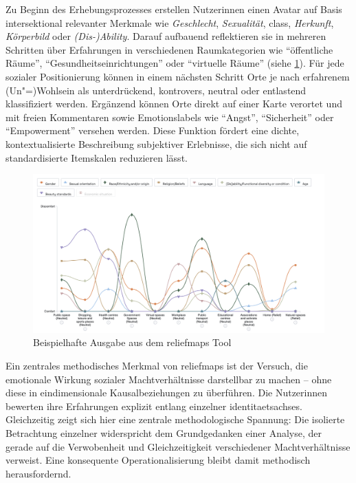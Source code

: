 Zu Beginn des Erhebungsprozesses erstellen Nutzer\genderstern innen einen Avatar auf Basis intersektional relevanter Merkmale wie \emph{Geschlecht}, \emph{Sexualität}, \gls{class}, \emph{Herkunft}, \emph{Körperbild} oder \emph{(Dis-)Ability}. Darauf aufbauend reflektieren sie in mehreren Schritten über Erfahrungen in verschiedenen Raumkategorien wie \enquote{öffentliche Räume}, \enquote{Gesundheitseinrichtungen} oder \enquote{virtuelle Räume} (siehe \cref{fig:relief_maps_plus_screenshot_1}). Für jede  sozialer Positionierung können in einem nächsten Schritt Orte je nach erfahrenem (Un\nobreakdash"=)Wohlsein als unterdrückend, kontrovers, neutral oder entlastend klassifiziert werden. Ergänzend können Orte direkt auf einer Karte verortet und mit freien Kommentaren sowie Emotionslabels wie \enquote{Angst}, \enquote{Sicherheit} oder \enquote{Empowerment} versehen werden. Diese Funktion fördert eine dichte, kontextualisierte Beschreibung subjektiver Erlebnisse, die sich nicht auf standardisierte Itemskalen reduzieren lässt.

\begin{figure}[htbp]
    \centering
    \includegraphics[width=\textwidth]{Arbeit/Bilder/reliefmap.png}
    \caption{Beispielhafte Ausgabe aus dem \gls{reliefmaps} Tool}
    \label{fig:relief_maps_plus_screenshot_1}
\end{figure}

Ein zentrales methodisches Merkmal von \gls{reliefmaps} ist der Versuch, die emotionale Wirkung sozialer Machtverhältnisse darstellbar zu machen -- ohne diese in eindimensionale Kausalbeziehungen zu überführen. Die Nutzer\genderstern innen bewerten ihre Erfahrungen explizit entlang einzelner \glspl{identitaetsachse}. Gleichzeitig zeigt sich hier eine zentrale methodologische Spannung: Die isolierte Betrachtung einzelner  widerspricht dem Grundgedanken einer  Analyse, der gerade auf die Verwobenheit und Gleichzeitigkeit verschiedener Machtverhältnisse verweist. Eine konsequente  Operationalisierung bleibt damit methodisch herausfordernd.

